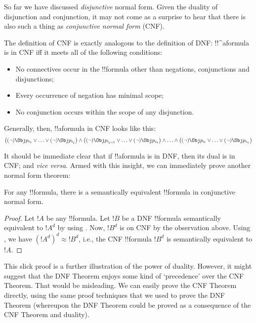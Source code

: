 \documentclass[../../../include/open-logic-section]{subfiles}
\begin{document}
So far we have discussed \emph{disjunctive} normal form. Given the duality of disjunction and conjunction, it may not come as a surprise to hear that there is also such a thing as \emph{conjunctive normal form} (CNF).

The definition of CNF is exactly analogous to the definition of DNF: !!^a{formula} is in CNF iff it meets all of the following conditions:
	\begin{itemize}
		\item No connectives occur in the !!{formula} other than negations, conjunctions and disjunctions;
		\item Every occurrence of negation has minimal scope;
		\item No conjunction occurs within the scope of any disjunction. 
	\end{itemize}
Generally, then, !!a{formula} in CNF looks like this:
$$\bigl((\lnot) {\Obj p_{i_1}} \lor \ldots \lor (\lnot) {\Obj p_{i_j}}\bigr) \land \bigl((\lnot) {\Obj p_{i_{j+1}}} \lor \ldots \lor (\lnot){\Obj p_{i_k}}\bigr) \land \ldots \land \bigl((\lnot){\Obj p_{i_{l}}} \lor \ldots \lor (\lnot) {\Obj p_{i_n}}\bigr)$$

It should be immediate clear that if !!a{formula} is in DNF, then its dual is in CNF; and \emph{vice versa}. Armed with this insight, we can immediately prove another normal form theorem:
	\begin{prop} For any !!{formula}, there is a semantically equivalent !!{formula} in conjunctive normal form.
	\end{prop}
\begin{proof}
	Let $!A$ be any !!{formula}. Let $!B$ be a DNF !!{formula} semantically equivalent to $!A^d$ by using . Now, $!B^d$ is on CNF by the observation above. Using , we have $(!A^d)^d \approx !B^d$, i.e., the CNF !!{formula} $!B^d$ is semantically equivalent to $!A$.
\end{proof}

This slick proof is a further illustration of the power of duality. However, it might suggest that the DNF Theorem enjoys some kind of `precedence' over the CNF Theorem. That would be misleading.  We can easily prove the CNF Theorem directly, using the same proof techniques that we used to prove the DNF Theorem (whereupon the DNF Theorem could be proved as a consequence of the CNF Theorem and duality). 
\end{document}
